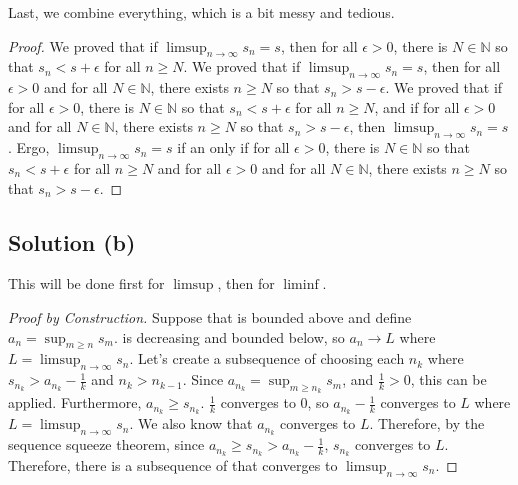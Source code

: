 \documentclass[11pt]{article}
\begin{document}
        Last, we combine everything, which is a bit messy and tedious. 
        \begin{proof}
            We proved that if $\limsup_{n \to \infty} s_n = s$, then for all $\epsilon > 0$, there is $N \in \mathbb{N}$ so that $s_n < s + \epsilon$ for all $n \geq N$.
            We proved that if $\limsup_{n \to \infty} s_n = s$, then for all $\epsilon > 0$ and for all $N \in \mathbb{N}$, there exists $n \geq N$ so that $s_n > s - \epsilon$.
            We proved that if for all $\epsilon > 0$, there is $N \in \mathbb{N}$ so that $s_n < s + \epsilon$ for all $n \geq N$, and if for all $\epsilon > 0$ and for all $N \in \mathbb{N}$, there exists $n \geq N$ so that $s_n > s - \epsilon$, then $\limsup_{n \to \infty} s_n = s$.
            Ergo, $\limsup_{n \to \infty} s_n = s$ if an only if for all $\epsilon > 0$, there is $N \in \mathbb{N}$ so that $s_n < s + \epsilon$ for all $n \geq N$ and for all $\epsilon > 0$ and for all $N \in \mathbb{N}$, there exists $n \geq N$ so that $s_n > s - \epsilon$.
        \end{proof}
    \pagebreak
    \subsection{Solution (b)}
        This will be done first for $\limsup$, then for $\liminf$.
        \begin{proof}[Proof by Construction]
            Suppose that  is bounded above and define $a_n = \sup_{m \geq n} s_m$.
             is decreasing and bounded below, so $a_n \to L$ where $L = \limsup_{n \to \infty} s_n$.
            Let's create a subsequence of  choosing each $n_k$ where $s_{n_k} > a_{n_k} - \frac{1}{k}$ and $n_k > n_{k - 1}$.
            Since $a_{n_k} = \sup_{m \geq n_k} s_m$, and $\frac{1}{k} > 0$, this can be applied.
            Furthermore, $a_{n_k} \geq s_{n_k}$.
            $\frac{1}{k}$ converges to $0$, so $a_{n_k} - \frac{1}{k}$ converges to $L$ where $L = \limsup_{n \to \infty} s_n$.
            We also know that $a_{n_k}$ converges to $L$.
            Therefore, by the sequence squeeze theorem, since $a_{n_k} \geq s_{n_k} > a_{n_k} - \frac{1}{k}$, $s_{n_k}$ converges to $L$.
            Therefore, there is a subsequence of  that converges to $\limsup_{n \to \infty} s_n$.
        \end{proof}
\end{document}
